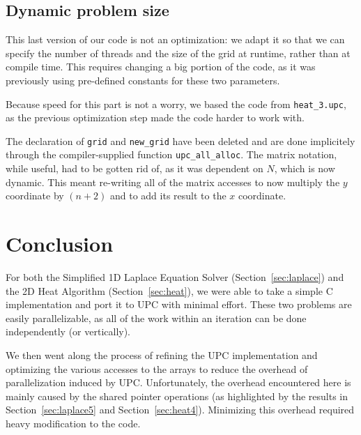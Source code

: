 \documentclass[12pt]{article}
\begin{document}


\subsection{Dynamic problem size}

This last version of our code is not an optimization: we adapt it so that we can specify the number of threads and the size of the grid at runtime, rather than at compile time.
This requires changing a big portion of the code, as it was previously using pre-defined constants for these two parameters.

Because speed for this part is not a worry, we based the code from \texttt{heat\_3.upc}, as the previous optimization step made the code harder to work with.

The declaration of \texttt{grid} and \texttt{new\_grid} have been deleted and are done implicitely through the compiler-supplied function \texttt{upc\_all\_alloc}.
The matrix notation, while useful, had to be gotten rid of, as it was dependent on $N$, which is now dynamic.
This meant re-writing all of the matrix accesses to now multiply the $y$ coordinate by $(n+2)$ and to add its result to the $x$ coordinate.



\section{Conclusion}

For both the Simplified 1D Laplace Equation Solver (Section~\ref{sec:laplace}) and the 2D Heat Algorithm (Section~\ref{sec:heat}), we were able to take a simple C implementation and port it to UPC with minimal effort.
These two problems are easily parallelizable, as all of the work within an iteration can be done independently (or vertically).

We then went along the process of refining the UPC implementation and optimizing the various accesses to the arrays to reduce the overhead of parallelization induced by UPC.
Unfortunately, the overhead encountered here is mainly caused by the shared pointer operations (as highlighted by the results in Section~\ref{sec:laplace5} and Section~\ref{sec:heat4}).
Minimizing this overhead required heavy modification to the code.
\end{document}
